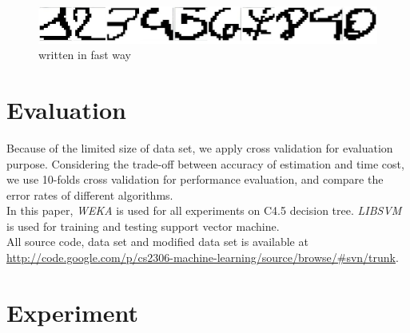 \documentclass[a4paper,11pt]{article}
\begin{document}
\begin{figure}
\centering
\includegraphics[width=1.0\textwidth]{unclear}
\caption{written in fast way}
\end{figure}

\section{Evaluation}

Because of the limited size of data set, we apply cross validation for evaluation purpose. Considering the trade-off between accuracy of estimation and time cost, we use 10-folds cross validation for performance evaluation, and compare the error rates of different algorithms.\\
In this paper, \emph{WEKA}\cite{weka} is used for all experiments on C4.5 decision tree. \emph{LIBSVM}\cite{libsvm} is used for training and testing support vector machine.\\
All source code, data set and modified data set is available at \url{http://code.google.com/p/cs2306-machine-learning/source/browse/#svn/trunk}.
\section{Experiment}
\end{document}
